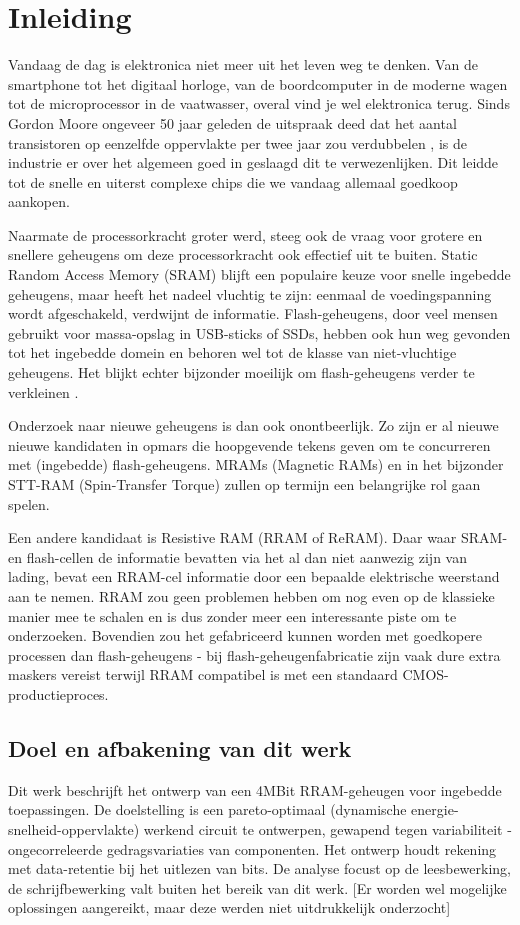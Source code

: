 \chapter{Inleiding}
\label{inleiding}

Vandaag de dag is elektronica niet meer uit het leven weg te denken. Van de smartphone tot het digitaal horloge, van de boordcomputer in de moderne wagen tot de microprocessor in de vaatwasser, overal vind je wel elektronica terug.
Sinds Gordon Moore ongeveer 50 jaar geleden de uitspraak deed dat het aantal transistoren op eenzelfde oppervlakte per twee jaar zou verdubbelen \cite{Moo65}, is de industrie er over het algemeen goed in geslaagd dit te verwezenlijken. Dit leidde tot de snelle en uiterst complexe chips die we vandaag allemaal goedkoop aankopen.

Naarmate de processorkracht groter werd, steeg ook de vraag voor grotere en snellere geheugens om deze processorkracht ook effectief uit te buiten. Static Random Access Memory (SRAM) blijft een populaire keuze voor snelle ingebedde geheugens, maar heeft het nadeel vluchtig te zijn: eenmaal de voedingspanning wordt afgeschakeld, verdwijnt de informatie. Flash-geheugens, door veel mensen gebruikt voor massa-opslag in USB-sticks of SSDs, hebben ook hun weg gevonden tot het ingebedde domein en behoren wel tot de klasse van niet-vluchtige geheugens.
Het blijkt echter bijzonder moeilijk om flash-geheugens verder te verkleinen \cite{Pra10}.

Onderzoek naar nieuwe geheugens is dan ook onontbeerlijk. Zo zijn er al nieuwe nieuwe kandidaten in opmars die hoopgevende tekens geven om te concurreren met (ingebedde) flash-geheugens. MRAMs (Magnetic RAMs) en in het bijzonder STT-RAM (Spin-Transfer Torque) zullen op termijn een belangrijke rol gaan spelen.

Een andere kandidaat is Resistive RAM (RRAM of ReRAM). Daar waar SRAM- en flash-cellen de informatie bevatten via het al dan niet aanwezig zijn van lading, bevat een RRAM-cel informatie door een bepaalde elektrische weerstand aan te nemen. RRAM zou geen problemen hebben om nog even op de klassieke manier mee te schalen en is dus zonder meer een interessante piste om te onderzoeken. Bovendien zou het gefabriceerd kunnen worden met goedkopere processen dan flash-geheugens - bij flash-geheugenfabricatie zijn vaak dure extra maskers vereist terwijl RRAM compatibel is met een standaard CMOS-productieproces.

\section{Doel en afbakening van dit werk}
Dit werk beschrijft het ontwerp van een 4MBit RRAM-geheugen voor ingebedde toepassingen. De doelstelling is een pareto-optimaal (dynamische energie-snelheid-oppervlakte) werkend circuit te ontwerpen, gewapend tegen variabiliteit - ongecorreleerde gedragsvariaties van componenten. Het ontwerp houdt rekening met data-retentie bij het uitlezen van bits. De analyse focust op de leesbewerking, de schrijfbewerking valt buiten het bereik van dit werk. [Er worden wel mogelijke oplossingen aangereikt, maar deze werden niet uitdrukkelijk onderzocht]

